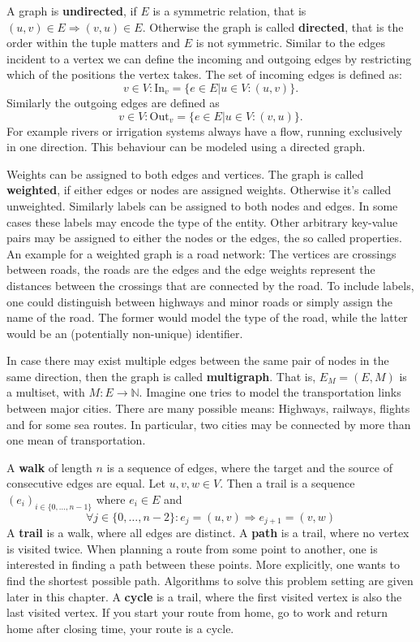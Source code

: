         A graph is \textbf{undirected}, if $E$ is a symmetric relation, that is $(u, v) \in E \Rightarrow (v, u) \in E$. 
        Otherwise the graph is called \textbf{directed}, that is the order within the tuple matters and $E$ is not symmetric.             
        Similar to the edges incident to a vertex we can define the incoming and outgoing edges by restricting which of the positions the vertex takes. 
        The set of incoming edges is defined as:
        \[v \in V: \text{In}_v = \{e \in E |u \in V: (u, v) \}.\]
        Similarly the outgoing edges are defined as 
        \[v \in V: \text{Out}_v = \{e \in E |u \in V: (v, u) \}.
        \]
        For example rivers or irrigation systems always have a flow, running exclusively in one direction. 
        This behaviour can be modeled using a directed graph.
        
        Weights can be assigned to both edges and vertices. The graph is called \textbf{weighted}, if either edges or nodes are assigned weights.
        Otherwise it's called unweighted.
        Similarly labels can be assigned to both nodes and edges. 
        In some cases these labels may encode the type of the entity.
        Other arbitrary key-value pairs may be assigned to either the nodes or the edges, the so called properties.           
        An example for a weighted graph is a road network: 
        The vertices are crossings between roads, the roads are the edges and the edge weights represent the distances between the crossings that are connected by the road.
        To include labels, one could distinguish between highways and minor roads or simply assign the name of the road. 
        The former would model the type of the road, while the latter would be an (potentially non-unique) identifier.
        
        In case there may exist multiple edges between the same pair of nodes in the same direction, then the graph is called \textbf{multigraph}. 
        That is, $E_M = (E, M)$ is a multiset, with $M: E \rightarrow \mathbb{N}$. 
        Imagine one tries to model the transportation links between major cities. 
        There are many possible means: Highways, railways, flights and for some sea routes. 
        In particular, two cities may be connected by more than one mean of transportation.
        
        A \textbf{walk} of length $n$ is a sequence of edges, where the target and the source of consecutive edges are equal. Let $u,v,w \in V$. Then a trail is a sequence $(e_i)_{i \in \{0, \dots, n-1\}}$ where $e_i \in E$ and
        \[ \forall j \in \{0, \dots, n-2\}: e_j = (u, v) \Rightarrow e_{j+1} = (v, w)\] 
        A \textbf{trail} is a walk, where all edges are distinct. 
        A \textbf{path} is a trail, where no vertex is visited twice.
        When planning a route from some point to another, one is interested in finding a path between these points.
        More explicitly, one wants to find the shortest possible path. 
        Algorithms to solve this problem setting are given later in this chapter. A \textbf{cycle} is a trail, where the first visited vertex is also the last visited vertex. 
        If you start your route from home, go to work and return home after closing time, your route is a cycle.
        
